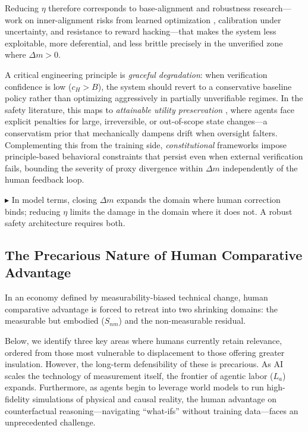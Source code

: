 \documentclass[12pt, letter]{article}
\begin{document}
Reducing $\eta$ therefore corresponds to base-alignment and robustness research---work on inner-alignment risks from learned optimization \citep{Hubinger2019}, calibration under uncertainty, and resistance to reward hacking---that makes the system less exploitable, more deferential, and less brittle precisely in the unverified zone where $\Delta m > 0$. 

A critical engineering principle is \emph{graceful degradation}: when verification confidence is low ($c_H > B$), the system should revert to a conservative baseline policy rather than optimizing aggressively in partially unverifiable regimes. In the safety literature, this maps to \emph{attainable utility preservation} \cite{Turner2020}, where agents face explicit penalties for large, irreversible, or out-of-scope state changes---a conservatism prior that mechanically dampens drift when oversight falters. Complementing this from the training side, \emph{constitutional} frameworks \cite{Bai2022} impose principle-based behavioral constraints that persist even when external verification fails, bounding the severity of proxy divergence within $\Delta m$ independently of the human feedback loop.

$\blacktriangleright$ In model terms, closing $\Delta m$ expands the domain where human correction binds; reducing $\eta$ limits the damage in the domain where it does not. A robust safety architecture requires both.


\subsection{The Precarious Nature of Human Comparative Advantage}

In an economy defined by measurability-biased technical change, human comparative advantage is forced to retreat into two shrinking domains: the measurable but embodied ($S_{nm}$) and the non-measurable residual.

Below, we identify three key areas where humans currently retain relevance, ordered from those most vulnerable to displacement to those offering greater insulation. However, the long-term defensibility of these is precarious. As AI scales the technology of measurement itself, the frontier of agentic labor ($L_a$) expands. Furthermore, as agents begin to leverage world models to run high-fidelity simulations of physical and causal reality, the human advantage on counterfactual reasoning—navigating ``what-ifs'' without training data—faces an unprecedented challenge.
\end{document}
